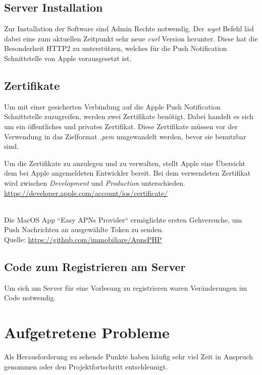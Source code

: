 \subsection{Server Installation}
Zur Installation der Software sind Admin Rechte notwendig. Der \textit{wget} Befehl läd dabei eine zum aktuellen Zeitpunkt sehr neue \textit{curl} Version herunter. Diese hat die Besonderheit HTTP2 zu unterstützen, welches für die Push Notification Schnittstelle von Apple vorausgesetzt ist.



\subsection{Zertifikate}
Um mit einer gesicherten Verbindung auf die Apple Push Notification Schnittstelle zuzugreifen, werden zwei Zertifikate benötigt. Dabei handelt es sich um ein öffentliches und privates Zertifikat. Diese Zertifikate müssen vor der Verwendung in das Zielformat \textit{.pem} umgewandelt werden, bevor sie benutzbar sind.

Um die Zertifikate zu anzulegen und zu verwalten, stellt Apple eine Übersicht dem bei Apple angemeldeten Entwickler bereit. Bei dem verwendeten Zertifikat wird zwischen \textit{Development} und \textit{Production} unterschieden.\\
\url{https://developer.apple.com/account/ios/certificate/}

\\
Die MacOS App ``Easy APNs Provider`` ermöglichte ersten Gehversuche, um Push Nachrichten an ausgewählte Token zu senden.\\
Quelle: \url{https://github.com/immobiliare/ApnsPHP}



\subsection{Code zum Registrieren am Server}
Um sich am Server für eine Vorlesung zu registrieren waren Veränderungen im Code notwendig.



\section{Aufgetretene Probleme}
Als Herausforderung zu sehende Punkte haben häufig sehr viel Zeit in Anspruch genommen oder den Projektfortschritt entschleunigt.


